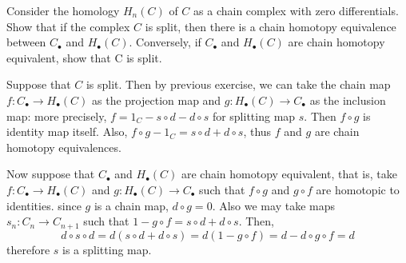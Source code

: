 \begin{exer} Consider the homology $H_n(C)$ of $C$ as a chain complex with zero differentials. Show that if the complex $C$ is split, then there is a chain homotopy equivalence between $C_\bullet$ and $H_\bullet(C)$. Conversely, if $C_\bullet$ and $H_\bullet(C)$ are chain homotopy equivalent, show that C is split.
\end{exer}
\begin{solution} Suppose that $C$ is split. Then by previous exercise, we can take the chain map $f:C_\bullet\rightarrow H_\bullet(C)$ as the projection map and $g:H_\bullet(C)\rightarrow C_\bullet$ as the inclusion map: more precisely, $f=1_C-s\circ d-d\circ s$ for splitting map $s$. Then $f\circ g$ is identity map itself. Also, $f\circ g-1_C=s\circ d+d\circ s$, thus $f$ and $g$ are chain homotopy equivalences.

Now suppose that $C_\bullet$ and $H_\bullet(C)$ are chain homotopy equivalent, that is, take $f:C_\bullet\rightarrow H_\bullet(C)$ and $g:H_\bullet(C)\rightarrow C_\bullet$ such that $f\circ g$ and $g\circ f$ are homotopic to identities. since $g$ is a chain map, $d\circ g=0$. Also we may take maps $s_n:C_n\rightarrow C_{n+1}$ such that $1-g\circ f=s\circ d+d\circ s$. Then,
\begin{equation}
d\circ s\circ d=d(s\circ d+d\circ s)=d(1-g\circ f)=d-d\circ g\circ f=d
\end{equation}
therefore $s$ is a splitting map.
\end{solution}

